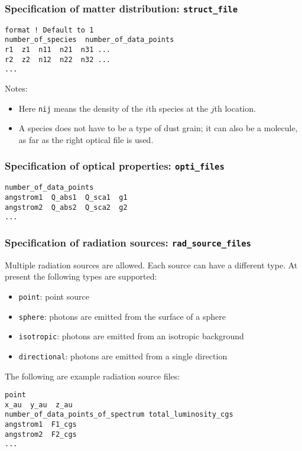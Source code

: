 \documentclass{article}
\newcommand{\cds}[1]{\texttt{#1}}
\begin{document}
\subsubsection{Specification of matter distribution: \cds{struct\_file}}

\begin{lstlisting}
format ! Default to 1
number_of_species  number_of_data_points
r1  z1  n11  n21  n31 ...
r2  z2  n12  n22  n32 ...
...
\end{lstlisting}
Notes:
\begin{itemize}
  \item Here \cds{nij} means the density of the \(i\)th species at the \(j\)th location.
  \item A species does not have to be a type of dust grain; it can also be a molecule, as far as the right optical file is used.
\end{itemize}  

\subsubsection{Specification of optical properties: \cds{opti\_files}}

\begin{lstlisting}
number_of_data_points
angstrom1  Q_abs1  Q_sca1  g1
angstrom2  Q_abs2  Q_sca2  g2
...
\end{lstlisting}

\subsubsection{Specification of radiation sources: \cds{rad\_source\_files}}

Multiple radiation sources are allowed.  Each source can have a different type.  At present the following types are supported:
\begin{itemize}
  \item \cds{point}: point source
  \item \cds{sphere}: photons are emitted from the surface of a sphere
  \item \cds{isotropic}: photons are emitted from an isotropic background
  \item \cds{directional}: photons are emitted from a single direction
\end{itemize}
The following are example radiation source files:

\begin{lstlisting}
point
x_au  y_au  z_au
number_of_data_points_of_spectrum total_luminosity_cgs
angstrom1  F1_cgs
angstrom2  F2_cgs
...
\end{lstlisting}
\end{document}
